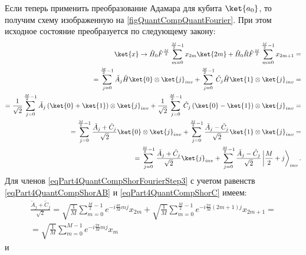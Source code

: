 

Если теперь применить преобразование Адамара 
для кубита
$\ket{a_0}$, то получим схему изображенную на
\autoref{figQuantCompQuantFourier}. При этом исходное состояние
преобразуется по следующему закону:
\begin{eqnarray}
\ket{x} \rightarrow
\hat{H}_0\hat{F}^{\frac{M}{2}} \sum_{m = 0}^{\frac{M}{2} - 1}x_{2m} \ket{2m} +
\hat{H}_0\hat{R}\hat{F}^{\frac{M}{2}}\sum_{m = 0}^{\frac{M}{2} - 1} x_{2m + 1} =
\nonumber \\
=
\sum_{j = 0}^{\frac{M}{2} - 1}
\tilde{A}_{j}
\hat{H}\ket{0} \otimes \ket{j}_{inv}
+
\sum_{j = 0}^{\frac{M}{2} - 1} 
\tilde{C}_{j}
\hat{H}\ket{1} \otimes \ket{j}_{inv} 
=
\nonumber \\
= 
\frac{1}{\sqrt{2}}\sum_{j = 0}^{\frac{M}{2} - 1}
\tilde{A}_{j} 
\left(\ket{0} + \ket{1} \right) \otimes  
\ket{j}_{inv}
+
\frac{1}{\sqrt{2}}\sum_{j = 0}^{\frac{M}{2} - 1}
\tilde{C}_{j} 
\left(\ket{0} - \ket{1} \right) \otimes  
\ket{j}_{inv}
=
\nonumber \\
=
\sum_{j = 0}^{\frac{M}{2} - 1}
\frac{\tilde{A}_{j} + \tilde{C}_{j} }{\sqrt{2}} 
\ket{0} \otimes \ket{j}_{inv} +
\sum_{j = 0}^{\frac{M}{2} - 1}
\frac{ \tilde{A}_{j} - \tilde{C}_{j}}{\sqrt{2}} 
\ket{1} \otimes \ket{j}_{inv}
=
\nonumber \\
=
\sum_{j = 0}^{\frac{M}{2} - 1}
\frac{\tilde{A}_{j} + \tilde{C}_{j} }{\sqrt{2}} \ket{j}_{inv} +
\sum_{j = 0}^{\frac{M}{2} - 1}
\frac{ \tilde{A}_{j} - \tilde{C}_{j}}{\sqrt{2}} 
\left|\frac{M}{2} + j \right>_{inv}.
\label{eqPart4QuantCompShorFourierStep3}
\end{eqnarray}
Для членов \eqref{eqPart4QuantCompShorFourierStep3} с учетом равенств
\eqref{eqPart4QuantCompShorAB} и \eqref{eqPart4QuantCompShorC} имеем:
\begin{eqnarray}
\frac{\tilde{A}_{j} + \tilde{C}_{j} }{\sqrt{2}} = 
\sqrt{\frac{1}{M}} 
\sum_{m = 0}^{\frac{M}{2} - 1} e^{-i \frac{4 \pi}{M} m j} x_{2m}  +
\sqrt{\frac{1}{M}} 
\sum_{m = 0}^{\frac{M}{2} - 1} 
e^{-i \frac{2 \pi}{M} \left(2m+1\right) j} x_{2m+1} = 
\nonumber \\
=
\sqrt{\frac{1}{M}} \sum_{m = 0}^{M - 1}
e^{-i \frac{2 \pi}{M} m j} x_{m}
\label{eqPart4QuantCompShorFourierStep3_1}
\end{eqnarray}
и
